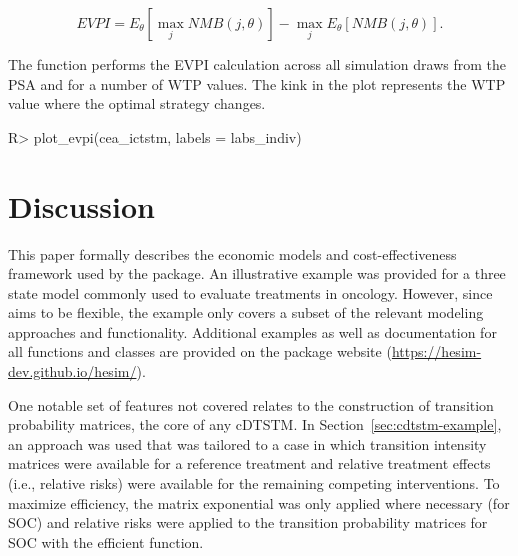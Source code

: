 \documentclass[article, nojss]{jss}\usepackage[]{graphicx}\usepackage[]{color}
\begin{document}
\begin{equation}
EVPI = E_\theta \left[\max_j NMB(j, \theta)\right] - \max_j E_\theta \left [ NMB(j, \theta)\right].
\end{equation}

The  function performs the EVPI calculation across all simulation draws from the PSA and for a number of WTP values. The kink in the plot represents the WTP value where the optimal strategy changes.

\begin{Schunk}
\begin{Sinput}
R> plot_evpi(cea_ictstm, labels = labs_indiv)
\end{Sinput}
\end{Schunk}

\section{Discussion} \label{sec:discussion}
This paper formally describes the economic models and cost-effectiveness framework used by the  package. An illustrative example was provided for a three state model commonly used to evaluate treatments in oncology. However, since  aims to be flexible, the example only covers a subset of the relevant modeling approaches and functionality. Additional examples as well as documentation for all functions and classes are provided on the package website (\url{https://hesim-dev.github.io/hesim/}). 

One notable set of features not covered relates to the construction of transition probability matrices, the core of any cDTSTM. In Section~\ref{sec:cdtstm-example}, an approach was used that was tailored to a case in which transition intensity matrices were available for a reference treatment and relative treatment effects (i.e., relative risks) were available for the remaining competing interventions. To maximize efficiency, the matrix exponential was only applied where necessary (for SOC) and relative risks were applied to the transition probability matrices for SOC with the efficient  function. 
\end{document}
